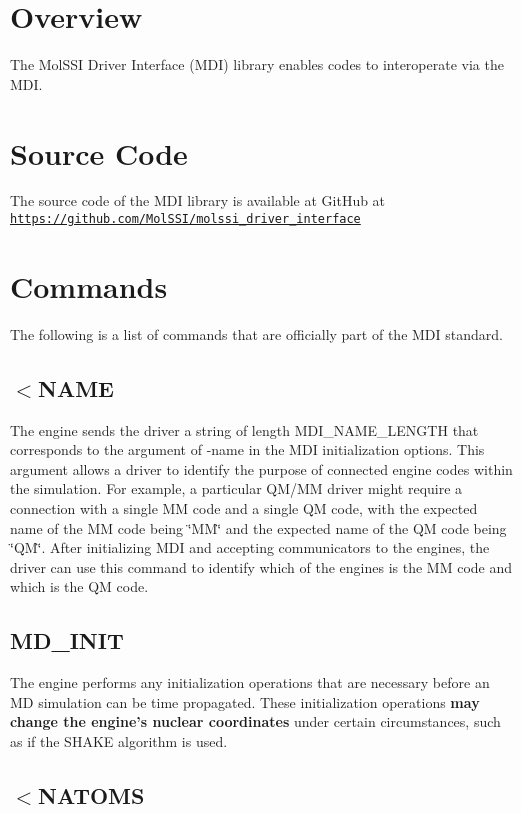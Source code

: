 \hypertarget{index_overview_sec}{}\section{Overview}\label{index_overview_sec}
The Mol\-S\-S\-I Driver Interface (M\-D\-I) library enables codes to interoperate via the M\-D\-I.\hypertarget{index_source_sec}{}\section{Source Code}\label{index_source_sec}
The source code of the M\-D\-I library is available at Git\-Hub at \href{https://github.com/MolSSI/molssi_driver_interface}{\tt https\-://github.\-com/\-Mol\-S\-S\-I/molssi\-\_\-driver\-\_\-interface}\hypertarget{index_commands_sec}{}\section{Commands}\label{index_commands_sec}
The following is a list of commands that are officially part of the M\-D\-I standard.\hypertarget{index_send_name}{}\subsection{$<$\-N\-A\-M\-E}\label{index_send_name}
The engine sends the driver a string of length {\ttfamily M\-D\-I\-\_\-\-N\-A\-M\-E\-\_\-\-L\-E\-N\-G\-T\-H} that corresponds to the argument of {\ttfamily -\/name} in the M\-D\-I initialization options. This argument allows a driver to identify the purpose of connected engine codes within the simulation. For example, a particular Q\-M/\-M\-M driver might require a connection with a single M\-M code and a single Q\-M code, with the expected name of the M\-M code being \char`\"{}\-M\-M\char`\"{} and the expected name of the Q\-M code being \char`\"{}\-Q\-M\char`\"{}. After initializing M\-D\-I and accepting communicators to the engines, the driver can use this command to identify which of the engines is the M\-M code and which is the Q\-M code.\hypertarget{index_md_init}{}\subsection{M\-D\-\_\-\-I\-N\-I\-T}\label{index_md_init}
The engine performs any initialization operations that are necessary before an M\-D simulation can be time propagated. These initialization operations {\bfseries  may change the engine's nuclear coordinates } under certain circumstances, such as if the S\-H\-A\-K\-E algorithm is used.\hypertarget{index_recv_natoms}{}\subsection{$<$\-N\-A\-T\-O\-M\-S}\label{index_recv_natoms}
